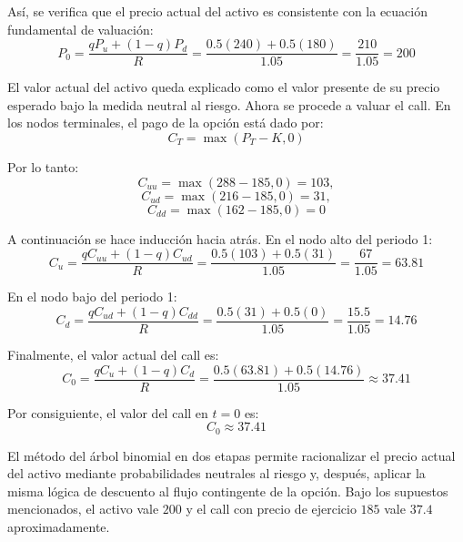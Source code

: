 \documentclass{article}\usepackage[]{graphicx}\usepackage[]{xcolor}
\begin{document}
Así, se verifica que el precio actual del activo es consistente con la ecuación fundamental de valuación:
\[
P_0=\frac{qP_u+(1-q)P_d}{R}
=\frac{0.5(240)+0.5(180)}{1.05}
=\frac{210}{1.05}=200
\]

El valor actual del activo queda explicado como el valor presente de su precio esperado bajo la medida neutral al riesgo. Ahora se procede a valuar el call. En los nodos terminales, el pago de la opción está dado por:
\[
C_T=\max(P_T-K,0)
\]

Por lo tanto:
\[
C_{uu}=\max (288-185,0)=103,
\]
\[
C_{ud}=\max (216-185,0)=31,
\]
\[
C_{dd}=\max (162-185,0)=0
\]

A continuación se hace inducción hacia atrás. En el nodo alto del periodo 1:
\[
C_u=\frac{qC_{uu}+(1-q)C_{ud}}{R}
=\frac{0.5(103)+0.5(31)}{1.05}
=\frac{67}{1.05}=63.81
\]

En el nodo bajo del periodo 1:
\[
C_d=\frac{qC_{ud}+(1-q)C_{dd}}{R}=\frac{0.5(31)+0.5(0)}{1.05}=\frac{15.5}{1.05}=14.76
\]

Finalmente, el valor actual del call es:
\[
C_0=\frac{qC_u+(1-q)C_d}{R}
=\frac{0.5(63.81)+0.5(14.76)}{1.05}
\approx 37.41
\]

Por consiguiente, el valor del call en \(t=0\) es:
\[
\boxed{C_0\approx 37.41}
\]

El método del árbol binomial en dos etapas permite racionalizar el precio actual del activo mediante probabilidades neutrales al riesgo y, después, aplicar la misma lógica de descuento al flujo contingente de la opción. Bajo los supuestos mencionados, el activo vale \(200\) y el call con precio de ejercicio \(185\) vale \(37.4\) aproximadamente.
\end{document}
